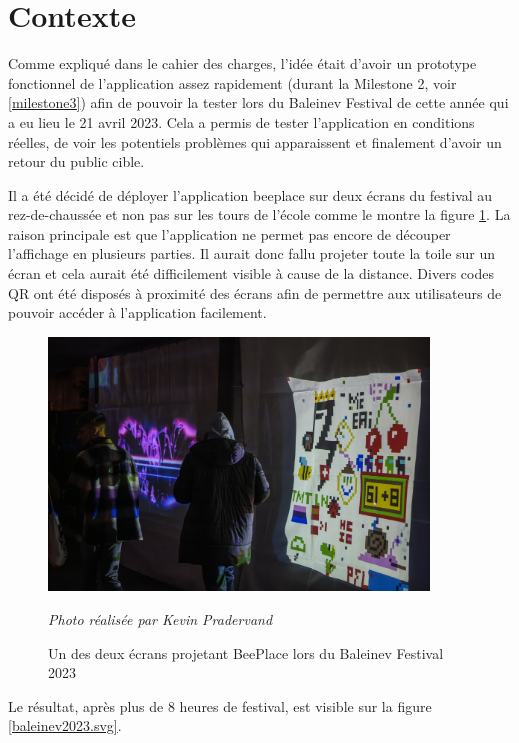 \section{Contexte}

Comme expliqué dans le cahier des charges, l'idée était d'avoir un prototype fonctionnel de l'application assez rapidement (durant la Milestone 2, voir \ref{milestone3}) afin de pouvoir la tester lors du Baleinev Festival de cette année qui a eu lieu le 21 avril 2023. Cela a permis de tester l'application en conditions réelles, de voir les potentiels problèmes qui apparaissent et finalement d'avoir un retour du public cible.

Il a été décidé de déployer l'application \gls{beeplace} sur deux écrans du festival au rez-de-chaussée et non pas sur les tours de l'école comme le montre la figure \ref{fig:beeplace-baleinev-2023}. La raison principale est que l'application ne permet pas encore de découper l'affichage en plusieurs parties. Il aurait donc fallu projeter toute la toile sur un écran et cela aurait été difficilement visible à cause de la distance. Divers codes QR ont été disposés à proximité des écrans afin de permettre aux utilisateurs de pouvoir accéder à l'application facilement.

\begin{figure}[H]
  \centering
  \includegraphics[width=0.9\textwidth]{assets/figures/beeplace-baleinev-2023.jpg}
  \begin{center}
    \textit{Photo réalisée par Kevin Pradervand}
  \end{center}
  \caption{Un des deux écrans projetant BeePlace lors du Baleinev Festival 2023}
  \label{fig:beeplace-baleinev-2023}
\end{figure}

Le résultat, après plus de 8 heures de festival, est visible sur la figure \ref{baleinev2023.svg}.

